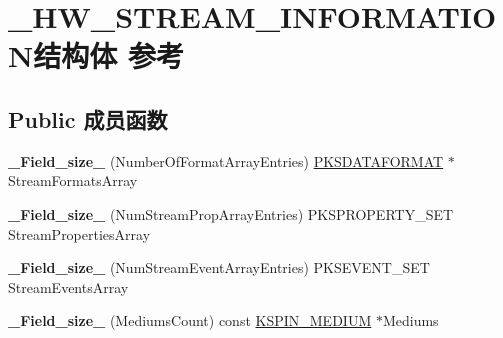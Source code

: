 \hypertarget{struct___h_w___s_t_r_e_a_m___i_n_f_o_r_m_a_t_i_o_n}{}\section{\+\_\+\+H\+W\+\_\+\+S\+T\+R\+E\+A\+M\+\_\+\+I\+N\+F\+O\+R\+M\+A\+T\+I\+O\+N结构体 参考}
\label{struct___h_w___s_t_r_e_a_m___i_n_f_o_r_m_a_t_i_o_n}
\subsection*{Public 成员函数}
\begin{DoxyCompactItemize}
\item 
\mbox{\label{struct___h_w___s_t_r_e_a_m___i_n_f_o_r_m_a_t_i_o_n_ad10178d294fa8bb53ab6127fe004dbf5}} 
{\bfseries \+\_\+\+Field\+\_\+size\+\_\+} (Number\+Of\+Format\+Array\+Entries) \hyperlink{struct_k_s_d_a_t_a_f_o_r_m_a_t}{P\+K\+S\+D\+A\+T\+A\+F\+O\+R\+M\+AT} $\ast$Stream\+Formats\+Array
\item 
\mbox{\label{struct___h_w___s_t_r_e_a_m___i_n_f_o_r_m_a_t_i_o_n_a8db4864c442858f3e9cc2ff7079bb1cf}} 
{\bfseries \+\_\+\+Field\+\_\+size\+\_\+} (Num\+Stream\+Prop\+Array\+Entries) P\+K\+S\+P\+R\+O\+P\+E\+R\+T\+Y\+\_\+\+S\+ET Stream\+Properties\+Array
\item 
\mbox{\label{struct___h_w___s_t_r_e_a_m___i_n_f_o_r_m_a_t_i_o_n_a9c82165b21baa1abb28fca9d3a829d4a}} 
{\bfseries \+\_\+\+Field\+\_\+size\+\_\+} (Num\+Stream\+Event\+Array\+Entries) P\+K\+S\+E\+V\+E\+N\+T\+\_\+\+S\+ET Stream\+Events\+Array
\item 
\mbox{\label{struct___h_w___s_t_r_e_a_m___i_n_f_o_r_m_a_t_i_o_n_a1f2d141770b9e9c0e3275b077adb2f0c}} 
{\bfseries \+\_\+\+Field\+\_\+size\+\_\+} (Mediums\+Count) const \hyperlink{struct_k_s_i_d_e_n_t_i_f_i_e_r}{K\+S\+P\+I\+N\+\_\+\+M\+E\+D\+I\+UM} $\ast$Mediums
\end{DoxyCompactItemize}
